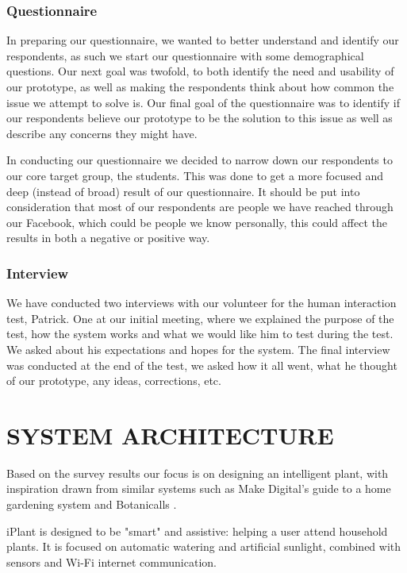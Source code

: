 \documentclass{ubicomp2012}
\begin{document}
\subsubsection{Questionnaire}
In preparing our questionnaire, we wanted to better understand and identify our respondents, as such we start our questionnaire with some demographical questions. Our next goal was twofold, to both identify the need and usability of our prototype, as well as making the respondents think about how common the issue we attempt to solve is. Our final goal of the questionnaire was to identify if our respondents believe our prototype to be the solution to this issue as well as describe any concerns they might have.

In conducting our questionnaire we decided to narrow down our respondents to our core target group, the students. This was done to get a more focused and deep (instead of broad) result of our questionnaire.
It should be put into consideration that most of our respondents are people we have reached through our Facebook, which could be people we know personally, this could affect the results in both a negative or positive way.

\subsubsection{Interview}
We have conducted two interviews with our volunteer for the human interaction test, Patrick. One at our initial meeting, where we explained the purpose of the test, how the system works and what we would like him to test during the test. We asked about his expectations and hopes for the system.
The final interview was conducted at the end of the test, we asked how it all went, what he thought of our prototype, any ideas, corrections, etc.

\section{SYSTEM ARCHITECTURE}
Based on the survey results our focus is on designing an intelligent plant, with inspiration drawn from similar systems such as Make Digital's guide to a home gardening system \cite{how-to-make-a-gardening-system} and Botanicalls \cite{botanicalls}.

iPlant is designed to be "smart" and assistive: helping a user attend household plants. It is focused on automatic watering and artificial sunlight, combined with sensors and Wi-Fi internet communication.
\end{document}
